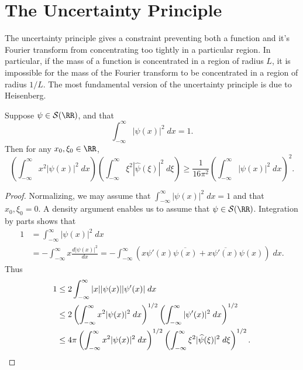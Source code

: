 \section{The Uncertainty Principle}

The uncertainty principle gives a constraint preventing both a function and it's Fourier transform from concentrating too tightly in a particular region. In particular, if the mass of a function is concentrated in a region of radius $L$, it is impossible for the mass of the Fourier transform to be concentrated in a region of radius $1/L$. The most fundamental version of the uncertainty principle is due to Heisenberg.

\begin{theorem}[Heisenberg]
    Suppose $\psi \in \mathcal{S}(\RR)$, and that
    \[ \int_{-\infty}^\infty |\psi(x)|^2\; dx = 1. \]
    Then for any $x_0,\xi_0 \in \RR$,
    \[ \left( \int_{-\infty}^\infty x^2 |\psi(x)|^2\; dx \right) \left( \int_{-\infty}^\infty \xi^2 |\widehat{\psi}(\xi)|^2\; d\xi \right) \geq \frac{1}{16 \pi^2} \left( \int_{-\infty}^\infty |\psi(x)|^2\; dx \right)^2. \]
\end{theorem}
\begin{proof}
    Normalizing, we may assume that $\int_{-\infty}^\infty |\psi(x)|^2\; dx = 1$ and that $x_0,\xi_0 = 0$. A density argument enables us to assume that $\psi \in \mathcal{S}(\RR)$. Integration by parts shows that
    \begin{align*}
        1 &= \int_{-\infty}^\infty |\psi(x)|^2\; dx\\
        &= - \int_{-\infty}^\infty x \frac{d|\psi(x)|^2}{dx} = - \int_{-\infty}^\infty (x \psi'(x) \overline{\psi(x)} + x \overline{\psi'(x)} \psi(x))\; dx.
    \end{align*}
    Thus
    \begin{align*}
        1 &\leq 2 \int_{-\infty}^\infty |x| |\psi(x)| |\psi'(x)|\; dx\\
        &\leq 2 \left( \int_{-\infty}^\infty x^2 |\psi(x)|^2\; dx \right)^{1/2} \left( \int_{-\infty}^\infty |\psi'(x)|^2\; dx \right)^{1/2}\\
        &\leq 4 \pi \left( \int_{-\infty}^\infty x^2 |\psi(x)|^2\; dx \right)^{1/2} \left( \int_{-\infty}^\infty \xi^2 |\widehat{\psi}(\xi)|^2\; d\xi \right)^{1/2}. \qedhere
    \end{align*}
\end{proof}

